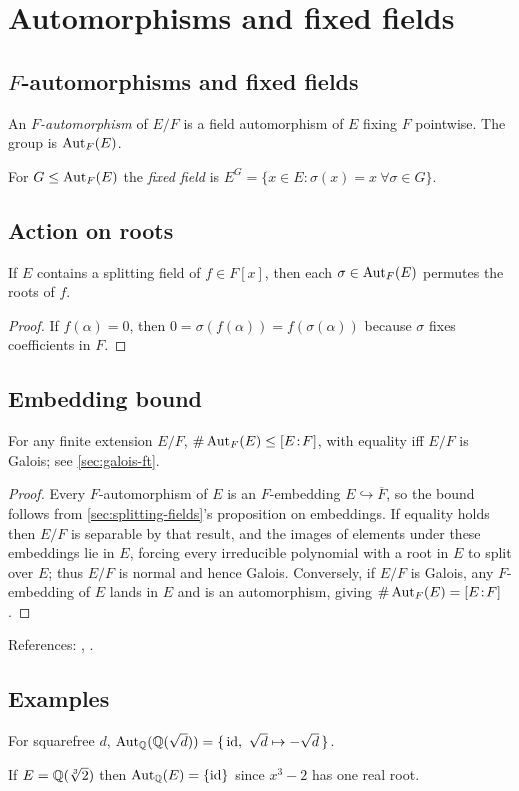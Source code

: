 \section{Automorphisms and fixed fields}\label{sec:autos-fixed}

\subsection{$F$-automorphisms and fixed fields}
\begin{definition}
An \emph{$F$-automorphism} of $E/F$ is a field automorphism of $E$ fixing $F$ pointwise. The group is $\operatorname{Aut}_F(E)$.
\end{definition}
\begin{definition}
For $G\le \operatorname{Aut}_F(E)$ the \emph{fixed field} is $E^G=\{x\in E:\sigma(x)=x\ \forall\sigma\in G\}$.
\end{definition}

\subsection{Action on roots}
\begin{proposition}\label{prop:permute-roots}
If $E$ contains a splitting field of $f\in F[x]$, then each $\sigma\in\operatorname{Aut}_F(E)$ permutes the roots of $f$.
\end{proposition}
\begin{proof}
If $f(\alpha)=0$, then $0=\sigma(f(\alpha))=f(\sigma(\alpha))$ because $\sigma$ fixes coefficients in $F$.
\end{proof}

\subsection{Embedding bound}
\begin{theorem}\label{thm:autobound}
For any finite extension $E/F$, $\#\operatorname{Aut}_F(E)\le [E\!:\!F]$, with equality iff $E/F$ is Galois; see \cref{sec:galois-ft}.
\end{theorem}
\begin{proof}
Every $F$-automorphism of $E$ is an $F$-embedding $E\hookrightarrow\overline{F}$,
so the bound follows from \cref{sec:splitting-fields}'s proposition on
embeddings. If equality holds then $E/F$ is separable by that result, and the
images of elements under these embeddings lie in $E$, forcing every irreducible
polynomial with a root in $E$ to split over $E$; thus $E/F$ is normal and hence
Galois. Conversely, if $E/F$ is Galois, any $F$-embedding of $E$ lands in $E$ and
is an automorphism, giving $\#\operatorname{Aut}_F(E)=[E\!:\!F]$.
\end{proof}
References: \cite[\S14]{DF}, \cite[Ch.~V]{Artin}.

\subsection{Examples}
\begin{example}[Quadratic]
For squarefree $d$, $\operatorname{Aut}_{\mathbb{Q}}(\mathbb{Q}(\sqrt d))=\{\,\mathrm{id},\ \sqrt d\mapsto-\sqrt d\,\}$.
\end{example}
\begin{example}
If $E=\Q(\root3\of2)$ then $\operatorname{Aut}_{\mathbb{Q}}(E)=\{\mathrm{id}\}$ since $x^3-2$ has one real root.
\end{example}
